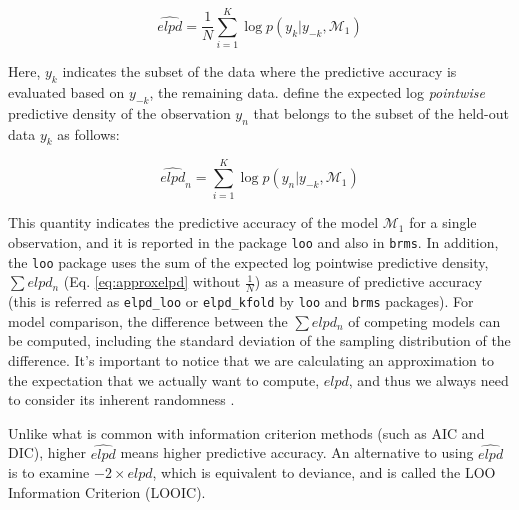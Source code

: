 \documentclass[12pt,]{krantz}
\theoremstyle{definition}
\theoremstyle{definition}
\theoremstyle{definition}
\theoremstyle{remark}
\begin{document}
\begin{equation}
\widehat{elpd} =  \frac{1}{N} \sum_{i=1}^{K} \log  p(y_k| y_{-k}, \mathcal{M}_1)
\label{eq:approxelpd}
\end{equation}

Here, \(y_k\) indicates the subset of the data where the predictive
accuracy is evaluated based on \(y_{-k}\), the remaining data.
\citet{vehtariPracticalBayesianModel2017} define the expected log
\emph{pointwise} predictive density of the observation \(y_n\) that
belongs to the subset of the held-out data \(y_{k}\) as follows:

\begin{equation}
\widehat{elpd}_{n} = \sum_{i=1}^{K} \log  p(y_n| y_{-k}, \mathcal{M}_1)
\end{equation}

This quantity indicates the predictive accuracy of the model
\(\mathcal{M}_1\) for a single observation, and it is reported in the
package \texttt{loo} and also in \texttt{brms}. In addition, the
\texttt{loo} package uses the sum of the expected log pointwise
predictive density, \(\sum elpd_n\) (Eq. \eqref{eq:approxelpd} without
\(\frac{1}{N}\)) as a measure of predictive accuracy (this is referred
as \texttt{elpd\_loo} or \texttt{elpd\_kfold} by \texttt{loo} and
\texttt{brms} packages). For model comparison, the difference between
the \(\sum elpd_n\) of competing models can be computed, including the
standard deviation of the sampling distribution of the difference. It's
important to notice that we are calculating an approximation to the
expectation that we actually want to compute, \(elpd\), and thus we
always need to consider its inherent randomness
\citep{vehtariLimitationsLimitationsBayesian2019}.

Unlike what is common with information criterion methods (such as AIC
and DIC), higher \(\widehat{elpd}\) means higher predictive accuracy. An
alternative to using \(\widehat{elpd}\) is to examine
\(-2\times \widehat{elpd}\), which is equivalent to deviance, and is
called the LOO Information Criterion (LOOIC).
\end{document}
